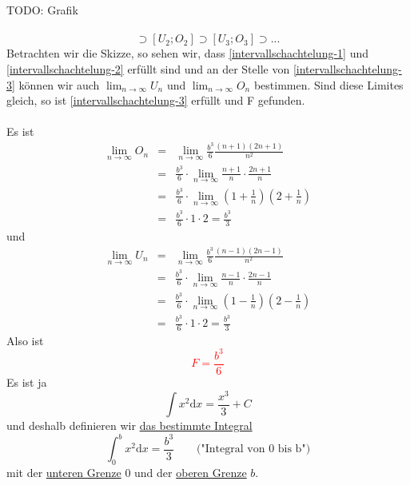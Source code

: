 \documentclass{report}
\begin{document}
\\\\TODO: Grafik\\\\
\begin{equation}[U_1;0] \supset [U_2;O_2] \supset [U_3; O_3] \supset ...\end{equation}
Betrachten wir die Skizze, so sehen wir, dass \ref{intervallschachtelung-1} und \ref{intervallschachtelung-2} erfüllt sind und an der Stelle von \ref{intervallschachtelung-3} können wir auch $\lim_{n \to \infty} U_n$ und $\lim_{n \to \infty} O_n$ bestimmen. Sind diese Limites gleich, so ist \ref{intervallschachtelung-3} erfüllt und F gefunden.\\\\
Es ist
\begin{eqnarray}\lim_{n \to \infty} O_n & = & \lim_{n \to \infty} \frac{b^3}{6} \frac{(n+1)(2n+1)}{n^2} \nonumber \\
& = & \frac{b^3}{6} \cdot \lim_{n \to \infty} \frac{n+1}{n} \cdot \frac{2n+1}{n} \nonumber \\
& = & \frac{b^3}{6} \cdot \lim_{n \to \infty} (1 + \frac{1}{n})(2 + \frac{1}{n}) \nonumber \\
& = & \frac{b^3}{6} \cdot 1 \cdot 2 = \frac{b^3}{3}\end{eqnarray}
und
\begin{eqnarray}\lim_{n \to \infty} U_n & = & \lim_{n \to \infty} \frac{b^3}{6} \frac{(n-1)(2n-1)}{n^2} \nonumber \\
& = & \frac{b^3}{6} \cdot \lim_{n \to \infty} \frac{n-1}{n} \cdot \frac{2n-1}{n} \nonumber \\
& = & \frac{b^3}{6} \cdot \lim_{n \to \infty} (1 - \frac{1}{n})(2 - \frac{1}{n}) \nonumber \\
& = & \frac{b^3}{6} \cdot 1 \cdot 2 = \frac{b^3}{3}\end{eqnarray}
Also ist
\textcolor{red}{\begin{equation}F = \frac{b^3}{6}\end{equation}}
Es ist ja
\begin{equation}\int x^2 \mathrm{d}x = \frac{x^3}{3} + C\end{equation}
und deshalb definieren wir \underline{das bestimmte Integral}
\begin{equation}\int_0^b x^2 \mathrm{d}x = \frac{b^3}{3} \quad \quad \mbox{("Integral von 0 bis b")}\end{equation}
mit der \underline{unteren Grenze} $0$ und der \underline{oberen Grenze} $b$.
\end{document}
